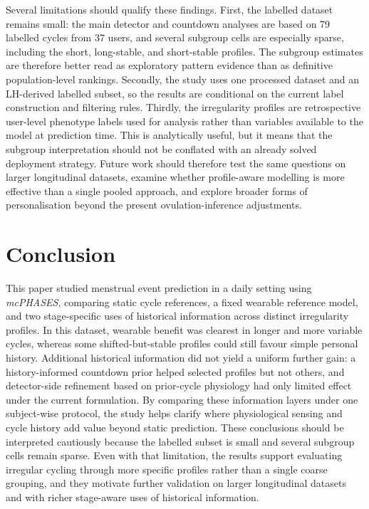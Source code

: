 \documentclass[conference]{IEEEtran}
\begin{document}
Several limitations should qualify these findings. First, the labelled dataset remains small: the main detector and countdown analyses are based on 79 labelled cycles from 37 users, and several subgroup cells are especially sparse, including the short, long-stable, and short-stable profiles. The subgroup estimates are therefore better read as exploratory pattern evidence than as definitive population-level rankings. Secondly, the study uses one processed dataset and an LH-derived labelled subset, so the results are conditional on the current label construction and filtering rules. Thirdly, the irregularity profiles are retrospective user-level phenotype labels used for analysis rather than variables available to the model at prediction time. This is analytically useful, but it means that the subgroup interpretation should not be conflated with an already solved deployment strategy. Future work should therefore test the same questions on larger longitudinal datasets, examine whether profile-aware modelling is more effective than a single pooled approach, and explore broader forms of personalisation beyond the present ovulation-inference adjustments.


\section{Conclusion}
This paper studied menstrual event prediction in a daily setting using \textit{mcPHASES}, comparing static cycle references, a fixed wearable reference model, and two stage-specific uses of historical information across distinct irregularity profiles. In this dataset, wearable benefit was clearest in longer and more variable cycles, whereas some shifted-but-stable profiles could still favour simple personal history. Additional historical information did not yield a uniform further gain: a history-informed countdown prior helped selected profiles but not others, and detector-side refinement based on prior-cycle physiology had only limited effect under the current formulation. By comparing these information layers under one subject-wise protocol, the study helps clarify where physiological sensing and cycle history add value beyond static prediction. These conclusions should be interpreted cautiously because the labelled subset is small and several subgroup cells remain sparse. Even with that limitation, the results support evaluating irregular cycling through more specific profiles rather than a single coarse grouping, and they motivate further validation on larger longitudinal datasets and with richer stage-aware uses of historical information.



\printbibliography
\vspace{12pt}
\end{document}
